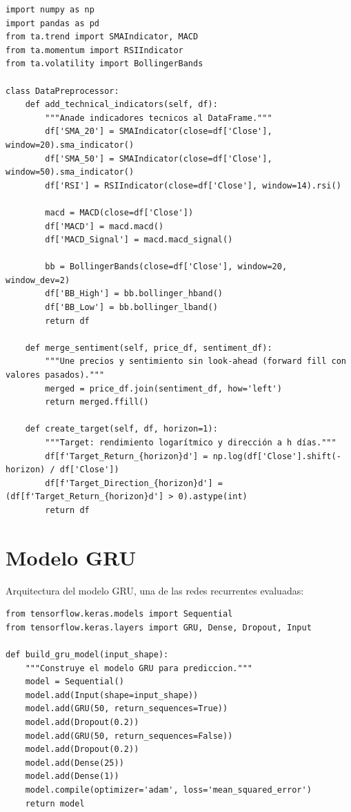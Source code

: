 \begin{lstlisting}[frame=single, caption={Preprocesador con indicadores técnicos}]
import numpy as np
import pandas as pd
from ta.trend import SMAIndicator, MACD
from ta.momentum import RSIIndicator
from ta.volatility import BollingerBands

class DataPreprocessor:
    def add_technical_indicators(self, df):
        """Anade indicadores tecnicos al DataFrame."""
        df['SMA_20'] = SMAIndicator(close=df['Close'], window=20).sma_indicator()
        df['SMA_50'] = SMAIndicator(close=df['Close'], window=50).sma_indicator()
        df['RSI'] = RSIIndicator(close=df['Close'], window=14).rsi()
        
        macd = MACD(close=df['Close'])
        df['MACD'] = macd.macd()
        df['MACD_Signal'] = macd.macd_signal()
        
        bb = BollingerBands(close=df['Close'], window=20, window_dev=2)
        df['BB_High'] = bb.bollinger_hband()
        df['BB_Low'] = bb.bollinger_lband()
        return df

    def merge_sentiment(self, price_df, sentiment_df):
        """Une precios y sentimiento sin look-ahead (forward fill con valores pasados)."""
        merged = price_df.join(sentiment_df, how='left')
        return merged.ffill()

    def create_target(self, df, horizon=1):
        """Target: rendimiento logarítmico y dirección a h días."""
        df[f'Target_Return_{horizon}d'] = np.log(df['Close'].shift(-horizon) / df['Close'])
        df[f'Target_Direction_{horizon}d'] = (df[f'Target_Return_{horizon}d'] > 0).astype(int)
        return df
\end{lstlisting}

\section{Modelo GRU}

Arquitectura del modelo GRU, una de las redes recurrentes evaluadas:

\begin{lstlisting}[frame=single, caption={Arquitectura del modelo GRU}]
from tensorflow.keras.models import Sequential
from tensorflow.keras.layers import GRU, Dense, Dropout, Input

def build_gru_model(input_shape):
    """Construye el modelo GRU para prediccion."""
    model = Sequential()
    model.add(Input(shape=input_shape))
    model.add(GRU(50, return_sequences=True))
    model.add(Dropout(0.2))
    model.add(GRU(50, return_sequences=False))
    model.add(Dropout(0.2))
    model.add(Dense(25))
    model.add(Dense(1))
    model.compile(optimizer='adam', loss='mean_squared_error')
    return model
\end{lstlisting}

